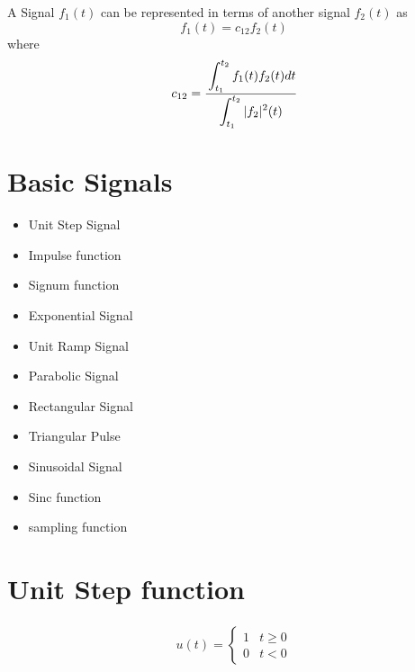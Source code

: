 \documentclass[12pt]{article}
\begin{document}
A Signal $f_{1}(t)$ can be represented in terms of another signal $f_{2}(t)$ as
$$
f_{1}(t) = c_{12} f_{2}(t)
$$
where 
$$
c_{12} = \cfrac{\displaystyle\int_{t_{1}}^{t_{2}}{f_{1}(t)f_{2}(t)dt} }{\displaystyle\int_{t_{1}}^{t_{2}} {|f_{2}|^{2}(t) } }
$$








\section{Basic Signals}



\begin{itemize}
	\item Unit Step Signal
	\item Impulse function
	\item Signum function
	\item Exponential Signal
	\item Unit Ramp Signal
	\item Parabolic Signal
	\item Rectangular Signal
	\item Triangular Pulse
	\item Sinusoidal Signal
	\item Sinc function
	\item sampling function
\end{itemize}





\section{Unit Step function}


\begin{align*}
u(t) = 
\begin{cases}
1 & t \geq 0 \\
0 & t < 0
\end{cases}
\end{align*}



\begin{center}
\end{center}
\end{document}
